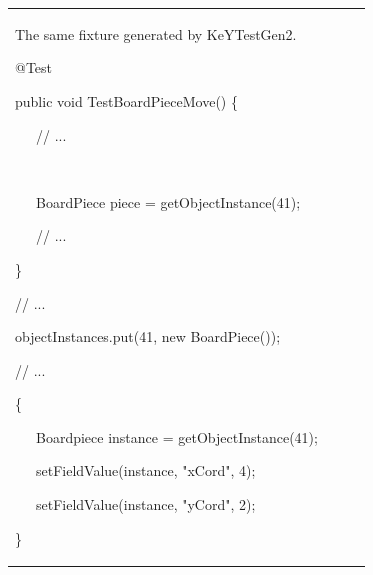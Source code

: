 \documentclass{article}
\newenvironment{tmindent}{\begin{tmparmod}{1.5em}{0pt}{0pt} }{\end{tmparmod}}
\newenvironment{tmparmod}[3]{\begin{list}{}{\setlength{\topsep}{0pt}\setlength{\leftmargin}{#1}\setlength{\rightmargin}{#2}\setlength{\parindent}{#3}\setlength{\listparindent}{\parindent}\setlength{\itemindent}{\parindent}\setlength{\parsep}{\parskip}} \item[]}{\end{list}}
\newenvironment{tmparsep}[1]{\begingroup\setlength{\parskip}{#1}}{\endgroup}
\begin{document}
\begin{tmparmod}{1cm}{0pt}{0pt}
  \begin{tmparmod}{0pt}{1cm}{0pt}
    {\noindent}{\noindent}\begin{tabular}{l}
      \begin{example}
        The same fixture generated by KeYTestGen2.
        
        {\noindent}\begin{tmindent}
          \begin{tmparsep}{0em}
            @Test
            
            public void TestBoardPieceMove() \{
            
            \ \ \ // ...
            
            \ \ \
            
            \ \ \ BoardPiece piece = getObjectInstance(41);
            
            
            
            \ \ \ // ...
            
            \}
            
            
            
            // ...
            
            
            
            objectInstances.put(41, new BoardPiece());
            
            
            
            // ...
            
            
            
            \{
            
            \ \ \ Boardpiece instance = getObjectInstance(41); \ \ \ \ \
            
            \ \ \ setFieldValue(instance, "xCord", 4);
            
            \ \ \ setFieldValue(instance, "yCord", 2);
            
            \}
          \end{tmparsep}
        \end{tmindent}{\hspace*{\fill}}{\medskip}
      \end{example}
    \end{tabular}{\hspace*{\fill}}{\smallskip}
  \end{tmparmod}
\end{tmparmod}
\end{document}
